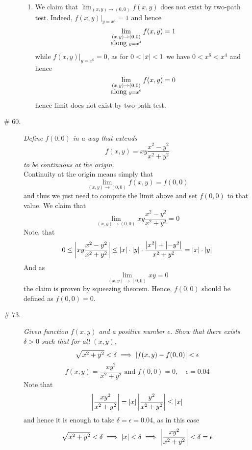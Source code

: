 \documentclass[8pt]{article} %
\begin{document}
\begin{description}
{\begin{enumerate}[\bfseries a.]
				$\delta=\myfrac{1}{2}$, so we can assume in subsequent that 
				$0<\sqrt{(x-2)^2+(y-3)^2}<\delta=\myfrac{1}
				{2}$. Therefore $\myabs{x-2},\myabs{y-3}<\myfrac{1}{2}$. Now
				\[\myabs{x-2}<\myfrac{1}{2}\implies x-2>-\myfrac{1}{2}\implies x>\myfrac{3}{2}\]
				\[\myabs{y-3}<\myfrac{1}{2}\implies y-3<\myfrac{1}{2}\implies y<\myfrac{7}{2}\]
				\[\myabs{y-3}<\myfrac{1}{2}\implies y-3>-\myfrac{1}{2}\implies y>\myfrac{5}{2}>0\]
				hence \[x^4>\frac{81}{16}>\frac{7}{2}>y>0\]
				and thus $\myabs{f(x,y)-0}=\myabs{0-0}=0<\epsilon$.
			\item We claim that $\lim_{(x,y)\to(0,0)}f(x,y)$ does not exist by two-path test. Indeed, 
				$f(x,y)\bigg|_{y=x^4}=1$ and hence 
				\[\lim_{\begin{subarray}{c}(x,y)\to(0,0)\\\mbox{along }y=x^4\end{subarray}}f(x,y)=1\]
					while $f(x,y)\bigg|_{y=x^6}=0$, as for $0<\left|x\right|<1$ we have $0<x^6<x^4$ and hence
				\[\lim_{\begin{subarray}{c}(x,y)\to(0,0)\\\mbox{along }y=x^6\end{subarray}}f(x,y)=0\]
				hence limit does not exist by two-path test.
		\end{enumerate}
		}
	\item[\# 60.]{{\it Define $f(0,0)$ in a way that extends \[f(x,y)=xy\frac{x^2-y^2}{x^2+y^2}\] to be continuous at the origin.}
		\\Continuity at the origin means simply that \[\lim_{(x,y)\to(0,0)}f(x,y)=f(0,0)\] and thus we just need to compute
		the limit above and set $f(0,0)$ to that value. We claim that \[\lim_{(x,y)\to(0,0)}xy\frac{x^2-y^2}{x^2+y^2}=0\]
		Note, that
		\[0\leq
		\left|xy\frac{x^2-y^2}{x^2+y^2}\right|\leq\left|x\right|\cdot\left|y\right|\cdot\frac{\left|x^2\right|+\left|-y^2\right|}{x^2+y^2}=\left|x\right|
		\cdot\left|y\right|\]
		And as \[\lim_{(x,y)\to(0,0)}xy=0\]
		the claim is proven by squeezing theorem. Hence, $f(0,0)$ should be defined as $f(0,0)=0$.
	}
	\item[\# 73.]{{\it Given function $f(x,y)$ and a positive number $\epsilon$. Show that there exists $\delta>0$ such that
		for all $(x,y)$,\[\sqrt{x^2+y^2}<\delta\implies\left|f(x,y)-f(0,0)\right|<\epsilon\]}
		\[f(x,y)=\frac{xy^2}{x^2+y^2}\mbox{ and }f(0,0)=0,\quad\epsilon=0.04\]
		Note that
		\[\left|\frac{xy^2}{x^2+y^2}\right|=\left|x\right|\left|\frac{y^2}{x^2+y^2}\right|\leq\left|x\right|\]
		and hence it is enough to take $\delta=\epsilon=0.04$, as in this case
		\[\sqrt{x^2+y^2}<\delta\implies\left|x\right|<\delta\implies\left|\frac{xy^2}{x^2+y^2}\right|<\delta=\epsilon\]
		}

\end{description}
\end{document}
